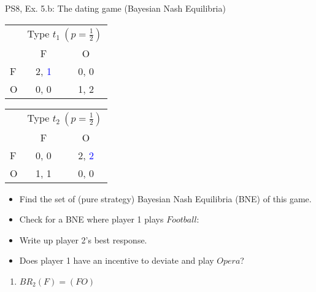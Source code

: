 \begin{frame}{PS8, Ex. 5.b: The dating game (Bayesian Nash Equilibria)}
    \begin{table}
      \begin{tabular}{l|c|c|}
        \multicolumn{1}{c}{} & \multicolumn{2}{c}{Type $t_1\ (p=\frac{1}{2})$} \\
        \multicolumn{1}{c}{} & \multicolumn{1}{c}{F} & \multicolumn{1}{c}{O} \\\cline{2-3}
        F & 2, \textcolor{blue}{1} & 0, 0 \\\cline{2-3}
        O & 0, 0 & 1, 2 \\\cline{2-3}
      \end{tabular}\quad\quad
      \begin{tabular}{l|c|c|}
        \multicolumn{1}{c}{} & \multicolumn{2}{c}{Type $t_2\ (p=\frac{1}{2})$} \\
        \multicolumn{1}{c}{} & \multicolumn{1}{c}{F} & \multicolumn{1}{c}{O} \\\cline{2-3}
        F & 0, 0 & 2, \textcolor{blue}{2} \\\cline{2-3}
        O & 1, 1 & 0, 0 \\\cline{2-3}
      \end{tabular}
    \end{table}
    \begin{itemize}
      \item[(b)] Find the set of (pure strategy) Bayesian Nash Equilibria (BNE) of this game.
    \end{itemize}
    \begin{multicols}{2}
      \begin{itemize}
        \item[Step 1:] Check for a BNE where player 1 plays $Football$:
        \item[1.a:] Write up player 2's best response.
        \item[1.b:] Does player 1 have an incentive to deviate and play $Opera$?
      \end{itemize}
      \vfill\null\columnbreak
      \begin{enumerate}
        \item[1.a:] $BR_2(F)=(FO)$
      \end{enumerate}
      \vfill\null
    \end{multicols}
\end{frame}
